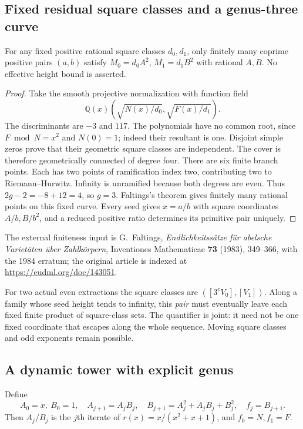 \subsection{Fixed residual square classes and a genus-three curve}
\begin{theorem}\label{qg-fixed-classes}
For any fixed positive rational square classes $d_0,d_1$, only finitely
many coprime positive pairs $(a,b)$ satisfy
$M_0=d_0A^2$, $M_1=d_1B^2$ with rational $A,B$.
No effective height bound is asserted.
\end{theorem}
\begin{proof}
Take the smooth projective normalization with function field
\[
 \mathbb Q(x)\left(\sqrt{N(x)/d_0},\sqrt{F(x)/d_1}\right).
\]
The discriminants are $-3$ and $117$. The polynomials have no common root,
since $F\bmod N=x^2$ and $N(0)=1$; indeed their resultant is one.
Disjoint simple zeros prove that their geometric square classes are
independent. The cover is therefore geometrically connected of degree four.
There are six finite branch points. Each has two points of ramification
index two, contributing two to Riemann--Hurwitz. Infinity is unramified
because both degrees are even. Thus $2g-2=-8+12=4$, so $g=3$.
Faltings's theorem gives finitely many rational points on this fixed curve.
Every seed gives $x=a/b$ with square coordinates $A/b,B/b^2$, and a reduced
positive ratio determines its primitive pair uniquely.
\end{proof}
The external finiteness input is G.~Faltings,
\emph{Endlichkeitss\"atze f\"ur abelsche Variet\"aten \"uber Zahlk\"orpern},
Inventiones Mathematicae \textbf{73} (1983), 349--366, with the 1984 erratum;
the original article is indexed at \url{https://eudml.org/doc/143051}.

For two actual even extractions the square classes are
$([3^eV_0],[V_1])$. Along a family whose seed height tends to infinity,
this \emph{pair} must eventually leave each fixed finite product of
square-class sets. The quantifier is joint: it need not be one fixed
coordinate that escapes along the whole sequence. Moving square classes
and odd exponents remain possible.

\subsection{A dynamic tower with explicit genus}
Define
\begin{equation}\label{qg-polynomial-recursion}
 A_0=x,\ B_0=1,\quad
 A_{j+1}=A_jB_j,\quad B_{j+1}=A_j^2+A_jB_j+B_j^2,
 \quad f_j=B_{j+1}.
\end{equation}
Then $A_j/B_j$ is the $j$th iterate of $r(x)=x/(x^2+x+1)$, and
$f_0=N,f_1=F$.

